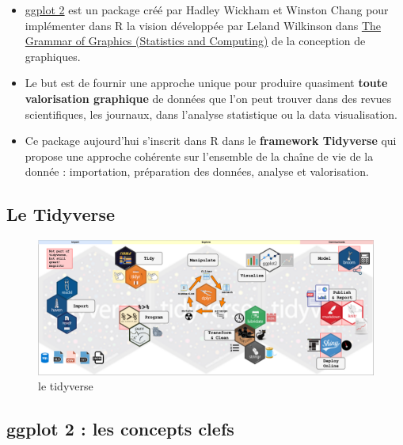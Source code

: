 \documentclass[
]{book}
\begin{document}
\begin{itemize}
\item
  \href{http://ggplot2.tidyverse.org/}{ggplot 2} est un package créé par Hadley Wickham et Winston Chang pour implémenter dans R la vision développée par Leland Wilkinson dans \href{https://www.amazon.com/Grammar-Graphics-Statistics-Computing/dp/0387245448/ref=as_li_ss_tl?ie=UTF8\&qid=1477928463\&sr=8-1\&keywords=the+grammar+of+graphics\&linkCode=sl1\&tag=ggplot2-20\&linkId=f0130e557161b83fbe97ba0e9175c431}{The Grammar of Graphics (Statistics and Computing)} de la conception de graphiques.
\item
  Le but est de fournir une approche unique pour produire quasiment \textbf{toute valorisation graphique} de données que l'on peut trouver dans des revues scientifiques, les journaux, dans l'analyse statistique ou la data visualisation.
\item
  Ce package aujourd'hui s'inscrit dans R dans le \textbf{framework Tidyverse} qui propose une approche cohérente sur l'ensemble de la chaîne de vie de la donnée : importation, préparation des données, analyse et valorisation.
\end{itemize}

\hypertarget{le-tidyverse}{%
\subsection{Le Tidyverse}\label{le-tidyverse}}

\begin{figure}
\hypertarget{id}{%
\centering
\includegraphics[width=8.33333in,height=\textheight]{pic/tidyverse.png}
\caption{le tidyverse}\label{id}
}
\end{figure}

\hypertarget{ggplot-2-les-concepts-clefs}{%
\subsection{ggplot 2 : les concepts clefs}\label{ggplot-2-les-concepts-clefs}}
\end{document}
